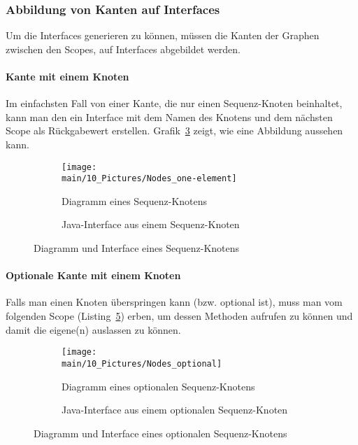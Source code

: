 \documentclass[../InterneDSLs.tex]{subfiles}
\begin{document}
\subsubsection{Abbildung von Kanten auf Interfaces}
Um die Interfaces generieren zu können, müssen die Kanten der Graphen zwischen den Scopes, auf Interfaces abgebildet werden.

\paragraph{Kante mit einem Knoten}
Im einfachsten Fall von einer Kante, die nur einen Sequenz-Knoten beinhaltet, kann man den ein Interface mit dem Namen des Knotens und dem nächsten Scope als Rückgabewert erstellen. Grafik~\ref{FIG:OneElementNode} zeigt, wie eine Abbildung aussehen kann.
\begin{figure}[ht]
\centering
  \begin{subfigure}[c]{0.49\textwidth}
    \texttt{[image: \\main/10\_Pictures/Nodes\_one-element]}
    \caption{Diagramm eines Sequenz-Knotens}
    \label{FIG:DiagramOneElementNode}
  \end{subfigure}
  \begin{subfigure}[c]{0.49\textwidth}
    
    \caption{Java-Interface aus einem Sequenz-Knoten}
    \label{FIG:JInterfaceOneElementNode}
  \end{subfigure}
  \caption{Diagramm und Interface eines Sequenz-Knotens}
  \label{FIG:OneElementNode}
\end{figure}

\paragraph{Optionale Kante mit einem Knoten}
Falls man einen Knoten überspringen kann (bzw. optional ist), muss man vom folgenden Scope (Listing~\ref{FIG:JInterfaceOptionalNode}) erben, um dessen Methoden aufrufen zu können und damit die eigene(n) auslassen zu können.
\begin{figure}[ht]
\centering
  \begin{subfigure}[c]{0.49\textwidth}
    \texttt{[image: \\main/10\_Pictures/Nodes\_optional]}
    \caption{Diagramm eines optionalen Sequenz-Knotens}
    \label{FIG:DiagramOptionalNode}
  \end{subfigure}
  \begin{subfigure}[c]{0.49\textwidth}
    
    \caption{Java-Interface aus einem optionalen Sequenz-Knoten}
    \label{FIG:JInterfaceOptionalNode}
  \end{subfigure}
  \caption{Diagramm und Interface eines optionalen Sequenz-Knotens}
  \label{FIG:OptionalNode}
\end{figure}
\end{document}
